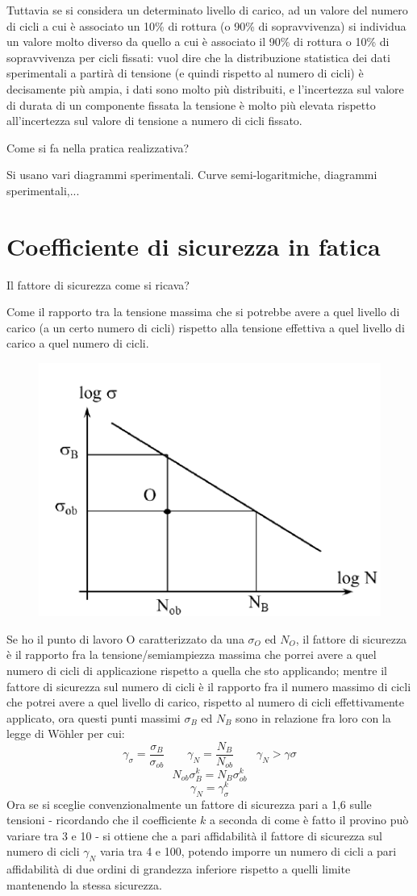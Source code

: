			Tuttavia se si considera un determinato livello di carico, ad un valore del numero di cicli a cui è associato un 10\% di rottura (o 90\% di sopravvivenza) si individua un valore molto diverso da quello a cui è associato il 90\% di rottura o 10\% di sopravvivenza per cicli fissati: vuol dire che la distribuzione statistica dei dati sperimentali a partirà di tensione (e quindi rispetto al numero di cicli) è decisamente più ampia, i dati sono molto più distribuiti, e l'incertezza sul valore di durata di un componente fissata la tensione è molto più elevata rispetto all'incertezza sul valore di tensione a numero di cicli fissato.  
			
			Come si fa nella pratica realizzativa? 
			
			Si usano vari diagrammi sperimentali.		
			Curve semi-logaritmiche, diagrammi sperimentali,...

\section{Coefficiente di sicurezza in fatica}
			Il fattore di sicurezza come si ricava? 
			
			Come il rapporto tra la tensione massima che si potrebbe avere a quel livello di carico (a un certo numero di cicli) rispetto alla tensione effettiva a quel livello di carico a quel numero di cicli.  
			\begin{figure}[H]
				\centering
				\includegraphics[width=0.4\linewidth]{immagini_11/screenshot018}
				\label{fig:screenshot018}
			\end{figure}			
			Se ho il punto di lavoro O caratterizzato da una $\sigma_O$ ed $N_O$, il fattore di sicurezza è il rapporto fra la tensione/semiampiezza massima che porrei avere a quel numero di cicli di applicazione rispetto a quella che sto applicando; mentre il fattore di sicurezza sul numero di cicli è il rapporto fra il numero massimo di cicli che potrei avere a quel livello di carico, rispetto al numero di cicli effettivamente applicato, ora questi punti massimi $\sigma_B$ ed $N_B$ sono in relazione fra loro con la legge di Wöhler per cui:
			\[\gamma_\sigma = \dfrac{\sigma_B}{\sigma_{ob}} \qquad \gamma_N = \dfrac{N_B}{N_{ob}} \qquad \gamma_N>\gamma\sigma\]
			\[N_{ob}\sigma_B^k = N_B\sigma_{ob}^k\]
			\[\gamma_N=\gamma_\sigma^k\]			
			Ora se si sceglie convenzionalmente un fattore di sicurezza pari a 1,6 sulle tensioni - ricordando che il coefficiente $k$ a seconda di come è fatto il provino può variare tra 3 e 10 - si ottiene che a pari affidabilità il fattore di sicurezza sul numero di cicli $\gamma_N$ varia tra 4 e 100, potendo imporre un numero di cicli a pari affidabilità di due ordini di grandezza inferiore rispetto a quelli limite mantenendo la stessa sicurezza. 
			
